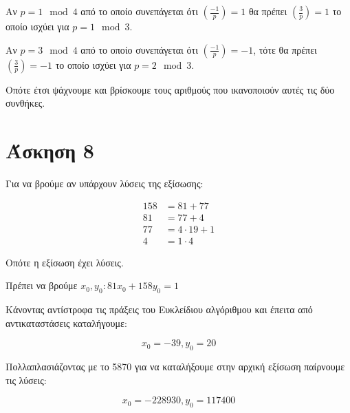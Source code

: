 \documentclass[11pt, oneside]{article}   	%
\begin{document}
Αν $p = 1 \mod 4$ από το οποίο συνεπάγεται ότι $\left(\frac{-1}{p}\right)=1$ θα πρέπει $\left(\frac{3}{p}\right)=1$ το οποίο ισχύει για $p = 1 \mod 3$.

Αν $p= 3 \mod 4$ από το οποίο συνεπάγεται ότι $\left(\frac{-1}{p}\right)=-1$, τότε θα πρέπει $\left(\frac{3}{p}\right)=-1$ το οποίο ισχύει για $p=2 \mod 3$.

Οπότε έτσι ψάχνουμε και βρίσκουμε τους αριθμούς που ικανοποιούν αυτές τις δύο συνθήκες.

\section{Άσκηση 8}

Για να βρούμε αν υπάρχουν λύσεις της εξίσωσης:

\begin{align*}
	158 &= 81 + 77 \\
	81 &= 77 +4 \\
	77 &= 4\cdot 19 + 1\\
	4 &= 1\cdot 4
\end{align*}

Οπότε η εξίσωση έχει λύσεις.

Πρέπει να βρούμε $x_0,y_0: 81x_0 + 158y_0 = 1$

Κάνοντας αντίστροφα τις πράξεις του Ευκλείδιου αλγόριθμου και έπειτα από αντικαταστάσεις καταλήγουμε:

\[x_0=-39, y_0 = 20\]

Πολλαπλασιάζοντας με το 5870 για να καταλήξουμε στην αρχική εξίσωση παίρνουμε τις λύσεις:

\[x_0 = -228930, y_0 = 117400\]
\end{document}
